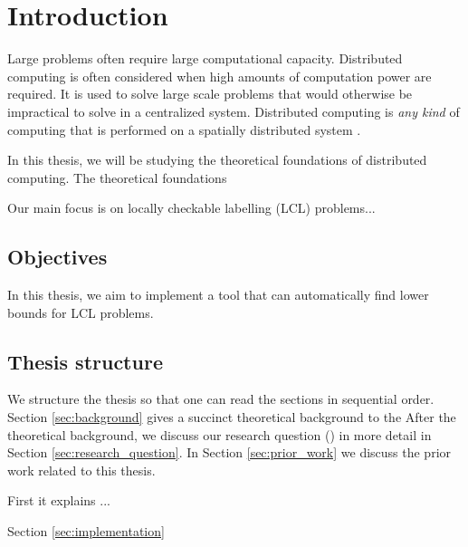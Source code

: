 
\section{Introduction}  \label{sec:introduction}

Large problems often require large computational capacity.
Distributed computing is often considered when high amounts of computation power are required.
It is used to solve large scale problems that would otherwise be impractical to solve in a centralized system.
Distributed computing is \emph{any kind} of computing that is performed on a spatially distributed system
\cite{DBLP:books/el/leeuwen90/LamportL90}.

In this thesis, we will be studying the theoretical foundations of distributed computing.
The theoretical foundations 

Our main focus is on locally checkable labelling (LCL) problems...

%

\subsection{Objectives}
In this thesis, we aim to implement a tool that can automatically find lower bounds for LCL problems.

\subsection{Thesis structure}
We structure the thesis so that one can read the sections in sequential order.
Section \ref{sec:background} gives a succinct theoretical background to the 
After the theoretical background, we discuss our research question () in more detail in Section \ref{sec:research_question}.
In Section \ref{sec:prior_work} we discuss the prior work related to this thesis.


First it explains ... %

Section \ref{sec:implementation}
